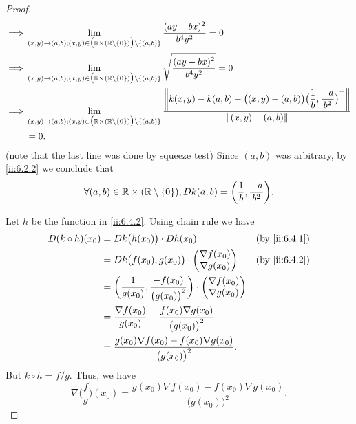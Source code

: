 \begin{proof}
\begin{align*}
    \implies & \lim_{(x, y) \to (a, b) ; (x, y) \in \big(\R \times (\R \setminus \set{0})\big) \setminus \set{(a, b)}} \dfrac{(ay - bx)^2}{b^4 y^2} = 0                                                                                                    \\
    \implies & \lim_{(x, y) \to (a, b) ; (x, y) \in \big(\R \times (\R \setminus \set{0})\big) \setminus \set{(a, b)}} \sqrt{\dfrac{(ay - bx)^2}{b^4 y^2}} = 0                                                                                             \\
    \implies & \lim_{(x, y) \to (a, b) ; (x, y) \in \big(\R \times (\R \setminus \set{0})\big) \setminus \set{(a, b)}} \dfrac{\norm*{k(x, y) - k(a, b) - \big((x, y) - (a, b)\big) \big(\dfrac{1}{b}, \dfrac{-a}{b^2}\big)^\top}}{\norm*{(x, y) - (a, b)}} \\
             & = 0.
  \end{align*}
  (note that the last line was done by squeeze test)
  Since \((a, b)\) was arbitrary, by \cref{ii:6.2.2} we conclude that
  \[
    \forall (a, b) \in \R \times (\R \setminus \set{0}), D k(a, b) = \bigg(\dfrac{1}{b}, \dfrac{-a}{b^2}\bigg).
  \]

  Let \(h\) be the function in \cref{ii:6.4.2}.
  Using chain rule we have
  \begin{align*}
    D (k \circ h)(x_0) & = D k\big(h(x_0)\big) \cdot D h(x_0)                                                       &  & \by{ii:6.4.1} \\
                       & = D k\big(f(x_0), g(x_0)\big) \cdot \begin{pmatrix}
                                                               \nabla f(x_0) \\
                                                               \nabla g(x_0)
                                                             \end{pmatrix}                                        &  & \by{ii:6.4.2}   \\
                       & = \bigg(\dfrac{1}{g(x_0)}, \dfrac{-f(x_0)}{\big(g(x_0)\big)^2}\bigg) \cdot \begin{pmatrix}
                                                                                                      \nabla f(x_0) \\
                                                                                                      \nabla g(x_0)
                                                                                                    \end{pmatrix}                     \\
                       & = \dfrac{\nabla f(x_0)}{g(x_0)} - \dfrac{f(x_0) \nabla g(x_0)}{\big(g(x_0)\big)^2}                            \\
                       & = \dfrac{g(x_0) \nabla f(x_0) - f(x_0) \nabla g(x_0)}{\big(g(x_0)\big)^2}.
  \end{align*}
  But \(k \circ h = f / g\).
  Thus, we have
  \[
    \nabla \bigg(\dfrac{f}{g}\bigg)(x_0) = \dfrac{g(x_0) \nabla f(x_0) - f(x_0) \nabla g(x_0)}{\big(g(x_0)\big)^2}.
  \]
\end{proof}

